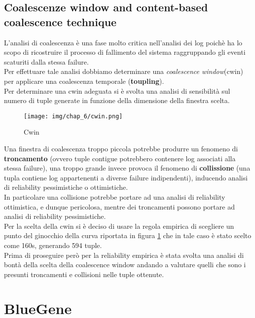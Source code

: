 \subsection{Coalescenze window and content-based coalescence technique}
L'analisi di coalescenza è una fase molto critica nell'analisi dei log poichè ha lo scopo di ricostruire il processo di fallimento del sistema raggruppando gli eventi scaturiti dalla stessa failure.\\
Per effettuare tale analisi dobbiamo determinare una \textit{coalescence window}(cwin) per applicare una coalescenza temporale (\textbf{toupling}).\\
Per determinare una cwin adeguata si è svolta una analisi di sensibilità sul numero di tuple generate in funzione della dimensione della finestra scelta.
 \begin{figure}[H]
    \centering
    \texttt{[image: img/chap\_6/cwin.png]}
    \caption{Cwin}
    \label{fig:cwindow}
\end{figure}
\noindent
Una finestra di coalescenza troppo piccola potrebbe produrre un fenomeno di \textbf{troncamento} (ovvero tuple contigue potrebbero contenere log associati alla stessa failure), una troppo grande invece provoca il fenomeno di \textbf{collissione} (una tupla contiene log appartenenti a diverse failure indipendenti), inducendo analisi di reliability pessimistiche o ottimistiche.\\
In particolare una collisione potrebbe portare ad una analisi di reliability ottimistica, e dunque pericolosa, mentre dei troncamenti possono portare ad analisi di reliability pessimistiche.\\
Per la scelta della cwin si è deciso di usare la regola empirica di scegliere un punto del ginocchio della curva riportata in figura \ref{fig:cwindow} che in tale caso è stato scelto come 160s, generando 594 tuple.\\
Prima di proseguire però per la reliability empirica è stata svolta una analisi di bontà della scelta della coalescence window andando a valutare quelli che sono i presunti troncamenti e collisioni nelle tuple ottenute.\\
\section{BlueGene}

